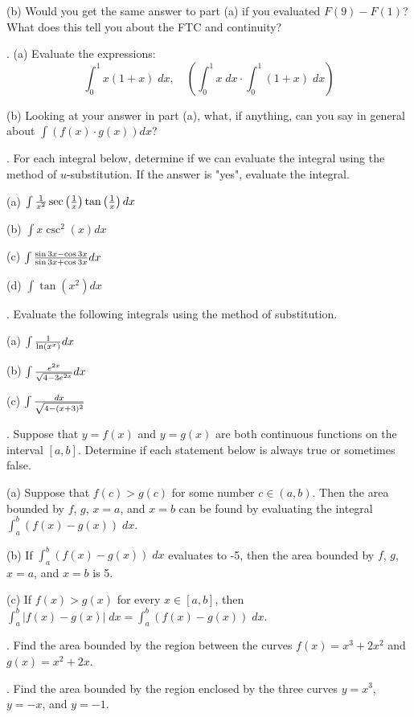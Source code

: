 \documentclass[12pt]{article}
\begin{document}
\noindent (b) Would you get the same answer to part (a) if you evaluated 
$F(9)-F(1)$?  What does this tell you about the FTC and continuity?

\bigskip
{}.  (a) Evaluate the expressions:
$$\int_0^1 x(1+x) \; dx, \quad \left ( \int_0^1 x \; dx \cdot \int_0^1 
(1+x) \; dx 
\right )$$

\noindent (b) Looking at your answer in part (a), what, if anything, can 
you say in general about $\int (f(x) \cdot g(x)) dx$?

\bigskip
{}.  For each integral below, determine if we can evaluate the 
integral using the method of $u$-substitution.  If the answer is "yes", 
evaluate the integral.

\noindent (a) $\int {{1}\over{x^2}} \sec \left ( {{1}\over{x}} \right ) 
\tan \left ( {{1}\over{x}} \right ) dx$

\noindent (b) $\int x \csc^2 (x) dx$

\noindent (c) $\int {{\sin 3x - \cos 3x}\over{\sin 3x + \cos 3x}} dx$

\noindent (d) $\int \tan (x^2) dx $

\bigskip
{}.  Evaluate the following integrals using the method of 
substitution.

\noindent (a) $\int {{1}\over{\ln(x^x)}} dx$

\noindent (b) $\int {{e^{2x}}\over{\sqrt{4-3e^{2x}}}} dx$

\noindent (c) $\int {{dx}\over{\sqrt{4 - (x+3)^2}}}$

.  Suppose that $y=f(x)$ and $y=g(x)$ are both continuous 
functions on the interval $[a,b]$.  Determine if each statement below is always 
true or sometimes false.

\noindent (a) Suppose that $f(c) > g(c)$ for some number $c \in (a,b)$.  Then the 
area bounded by $f$, $g$, $x=a$, and $x=b$ can be found by evaluating the integral 
$\int_a^b (f(x) - g(x) ) \; dx$. 

\noindent (b) If $\int_a^b (f(x) - g(x)) \; dx$ evaluates to -5, then the area 
bounded by $f$, $g$, $x=a$, and $x=b$ is 5.

\noindent (c) If $f(x) > g(x)$ for every $x \in [a,b]$, then
$\int_a^b |f(x) - g(x) | \; dx = \int_a^b (f(x) - g(x)) \; dx$.

.  Find the area bounded by the region
between the curves $f(x)=x^3+2x^2$ and 
$g(x)=x^2+2x$.

\medskip
{}.  Find the area bounded by the region enclosed by the three 
curves $y=x^3$, $y=-x$, and $y=-1$.
\end{document}
